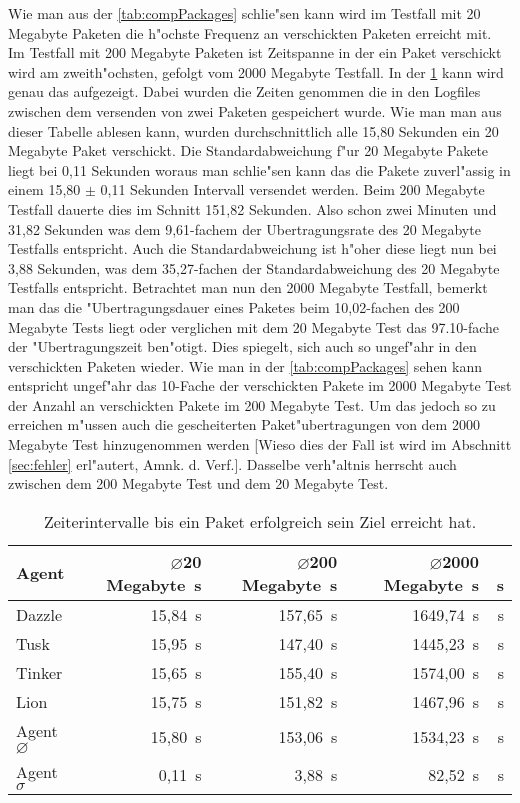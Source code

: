 Wie man aus der \cref{tab:compPackages} schlie"sen kann wird im Testfall mit 20 Megabyte Paketen %
die h"ochste Frequenz an verschickten Paketen erreicht mit. Im Testfall mit 200 Megabyte Paketen %
ist Zeitspanne in der ein Paket verschickt wird am zweith"ochsten, gefolgt vom 2000 Megabyte %
Testfall. In der \cref{tab:compZeiten} kann wird genau das aufgezeigt. Dabei wurden die Zeiten %
genommen die in den Logfiles zwischen dem versenden von zwei Paketen gespeichert wurde. Wie man man aus %
dieser Tabelle ablesen kann, wurden durchschnittlich alle 15,80 Sekunden ein 20 Megabyte %
Paket verschickt. Die Standardabweichung f"ur 20 Megabyte Pakete liegt bei 0,11 Sekunden %
woraus man schlie"sen kann das die Pakete zuverl"assig in einem 15,80 $\pm$ 0,11 Sekunden Intervall versendet %
werden. Beim 200 Megabyte Testfall dauerte dies im Schnitt 151,82 Sekunden. Also schon zwei Minuten und 31,82 Sekunden %
was dem 9,61-fachem der Ubertragungsrate des 20 Megabyte Testfalls entspricht. Auch die Standardabweichung ist h"oher %
diese liegt nun bei 3,88 Sekunden, was dem 35,27-fachen der Standardabweichung des 20 Megabyte Testfalls %
entspricht. Betrachtet man nun den 2000 Megabyte Testfall, bemerkt man das die "Ubertragungsdauer eines Paketes %
beim 10,02-fachen des 200 Megabyte Tests liegt oder verglichen mit dem 20 Megabyte Test das 97.10-fache der %
"Ubertragungszeit ben"otigt. Dies spiegelt, sich auch so ungef"ahr in den verschickten Paketen wieder. %
Wie man in der \cref{tab:compPackages} sehen kann entspricht ungef"ahr das 10-Fache der verschickten Pakete im %
2000 Megabyte Test der Anzahl an verschickten Pakete im 200 Megabyte Test. Um das jedoch so zu erreichen m"ussen %
auch die gescheiterten Paket"ubertragungen von dem 2000 Megabyte Test hinzugenommen werden [Wieso dies der Fall ist wird im Abschnitt %
\cref{sec:fehler} erl"autert, Amnk. d. Verf.]. Dasselbe verh"altnis herrscht auch zwischen dem 200 Megabyte Test und %
dem 20 Megabyte Test.  

\begin{table}
\centering
\begin{tabular}{l%
 r<{\,s}%
 r<{\,s}%
 r<{\,s}%
 r<{\,s}%
}
Agent  				& $\diameter $20 Megabyte		& $\diameter $200 Megabyte		& $\diameter $2000 Megabyte		\\
\hline
Dazzle 				& 15,84			 		& 157,65				& 1649,74					\\
Tusk 				& 15,95					& 147,40				& 1445,23				\\
Tinker				& 15,65					& 155,40				& 1574,00				\\
Lion				& 15,75					& 151,82				& 1467,96				\\ 
Agent $\diameter $  		& 15,80					& 153,06			 	& 1534,23				\\   
Agent $\sigma $			& 0,11		 			& 3,88					& 82,52      				\\
\end{tabular}
\caption{Zeiterintervalle bis ein Paket erfolgreich sein Ziel erreicht hat.}
\label{tab:compZeiten}
\end{table}

